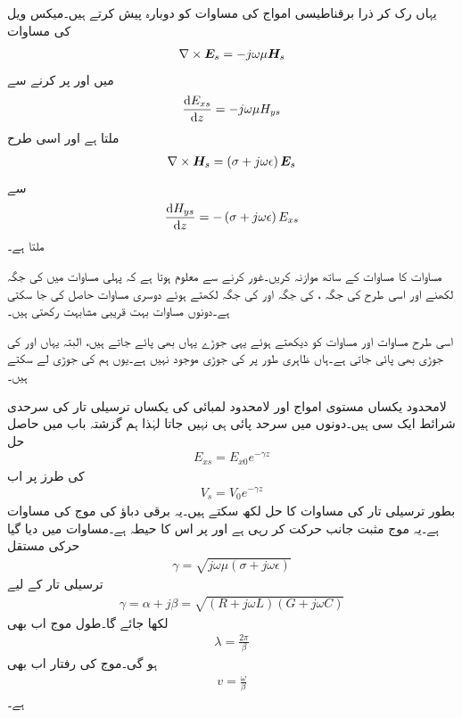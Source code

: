 یہاں رک کر ذرا برقناطیسی امواج کی مساوات کو دوبارہ پیش کرتے ہیں۔میکس ویل کی مساوات
\begin{align*}
\nabla \times {\ensuremath{{\boldsymbol{E}}}}_s=-j \omega \mu {\ensuremath{{\boldsymbol{H}}}}_s
\end{align*}
میں  اور   پر کرنے سے
\begin{align}\label{مساوات_ترسیل_برقی_شدت_تفرقی_مساوات}
\frac{\dif E_{xs}}{\dif z}=-j \omega \mu H_{ys}
\end{align}
ملتا ہے اور اسی طرح
\begin{align*}
\nabla \times {\ensuremath{{\boldsymbol{H}}}}_s=\left(\sigma+j\omega \epsilon \right){{\boldsymbol{E}}}_s
\end{align*}
سے
\begin{align}\label{مساوات_ترسیل_مقناطیسی_شدت_تفرقی_مساوات}
\frac{\dif H_{ys}}{\dif z}=-\left(\sigma+j \omega \epsilon \right) E_{xs}
\end{align}
ملتا ہے۔

مساوات  کا مساوات  کے ساتھ موازنہ کریں۔غور کرنے سے معلوم ہوتا ہے کہ پہلی مساوات میں  کی جگہ  لکھنے اور اسی طرح  کی جگہ ،  کی جگہ  اور  کی جگہ  لکھتے ہوئے دوسری مساوات حاصل کی جا سکتی ہے۔دونوں مساوات بہت قریبی مشابہت رکھتی ہیں۔

اسی طرح مساوات  اور مساوات  کو دیکھتے ہوئے  یہی جوڑے یہاں بھی پائے جاتے ہیں، البتہ یہاں  اور  کی جوڑی بھی پائی جاتی ہے۔ہاں ظاہری طور پر  کی جوڑی موجود نہیں ہے۔یوں ہم  کی جوڑی  لے سکتے ہیں۔

لامحدود یکساں مستوی امواج اور لامحدود لمبائی کی یکساں ترسیلی تار کی سرحدی شرائط ایک سی ہیں۔دونوں میں سرحد پائی ہی نہیں جاتا لہٰذا  ہم گزشتہ باب میں حاصل حل
\begin{align*}
E_{xs}=E_{x0} e^{- \gamma z}
\end{align*}
کی طرز پر اب
\begin{align}
V_s=V_0 e^{- \gamma z}
\end{align}
بطور ترسیلی تار کی مساوات کا حل لکھ سکتے ہیں۔یہ برقی دباؤ کی موج کی مساوات ہے۔یہ موج مثبت  جانب حرکت کر رہی ہے اور  پر اس کا حیطہ  ہے۔مساوات  میں دیا گیا حرکی مستقل
\begin{align*}
\gamma=\sqrt{j \omega \mu (\sigma +j\omega \epsilon)}
\end{align*}
ترسیلی تار کے لیے
\begin{align}
\gamma=\alpha+j\beta=\sqrt{(R+j\omega L)(G+j\omega C)}
\end{align}
لکھا جائے گا۔طول موج اب بھی
\begin{align}
\lambda=\frac{2\pi}{\beta}
\end{align}
ہو گی۔موج کی رفتار اب بھی
\begin{align}
v=\frac{\omega}{\beta}
\end{align}
ہے۔

